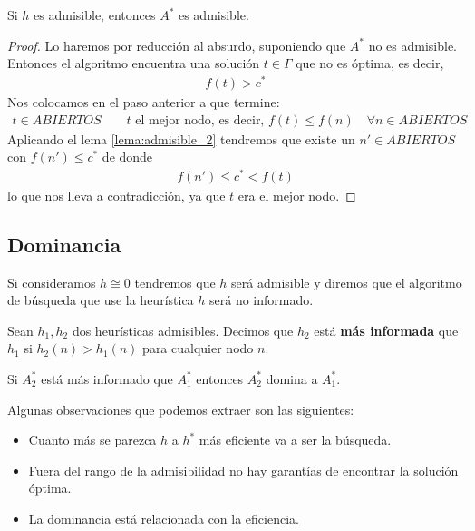 \begin{teo}
    Si $h$ es admisible, entonces $A^*$ es admisible.
    \begin{proof}
        Lo haremos por reducción al absurdo, suponiendo que $A^*$ no es admisible. Entonces el algoritmo encuentra una solución $t\in \Gamma$ que no es óptima, es decir, 
        \begin{gather*}
            f(t) > c^*
        \end{gather*} 
        Nos colocamos en el paso anterior a que termine:
        \begin{gather*}
            t\in ABIERTOS \qquad t \text{ el mejor nodo, es decir, } f(t) \leq f(n) \quad \forall n \in ABIERTOS
        \end{gather*}
        Aplicando el lema \ref{lema:admisible_2} tendremos que existe un $n'\in ABIERTOS$ con $f(n')\leq c^*$ de donde
        \begin{gather*}
            f(n') \leq c^* < f(t)
        \end{gather*}
        lo que nos lleva a contradicción, ya que $t$ era el mejor nodo.
    \end{proof}
\end{teo}

\subsection{Dominancia}

Si consideramos $h \cong 0$ tendremos que $h$ será admisible y diremos que el algoritmo de búsqueda que use la heurística $h$ será no informado.

\begin{definicion}
    Sean $h_1, h_2$ dos heurísticas admisibles. Decimos que $h_2$ está \textbf{más informada} que $h_1$ si $h_2(n)>h_1(n)$ para cualquier nodo $n$.
\end{definicion}

\begin{teo}
    Si $A_2^*$ está más informado que $A_1^*$ entonces $A_2^*$ domina a $A_1^*$.
\end{teo}

\begin{observacion}
    Algunas observaciones que podemos extraer son las siguientes:
    \begin{itemize}
        \item Cuanto más se parezca $h$ a $h^*$ más eficiente va a ser la búsqueda.
        \item Fuera del rango de la admisibilidad no hay garantías de encontrar la solución óptima.
        \item La dominancia está relacionada con la eficiencia.
    \end{itemize}
\end{observacion}

